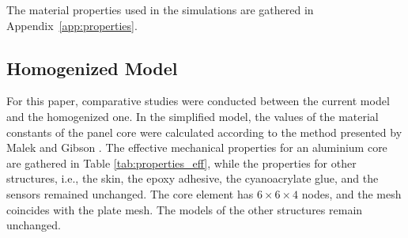 \documentclass[sensors,article,accept,moreauthors,pdftex]{Definitions/mdpi}
\begin{document}
\begin{paracol}{2}
The material properties used in the simulations are gathered in Appendix~\ref{app:properties}.
\subsection{Homogenized Model}
\label{sec:homogenization}
For this paper, comparative studies were conducted between the current model and the homogenized one. 
In the simplified model, the values of the material constants of the panel core were calculated according to the method presented by Malek and Gibson \cite{malek2015effective}.
The effective mechanical properties for an aluminium core are gathered in Table \ref{tab:properties_eff}, while the properties for other structures, i.e., the skin, the epoxy adhesive, the cyanoacrylate glue, and the sensors remained unchanged.
The core element has \(6 \times 6 \times 4\) nodes, and the mesh coincides with the plate mesh. The models of the other structures remain unchanged.

\end{paracol}
\end{document}
